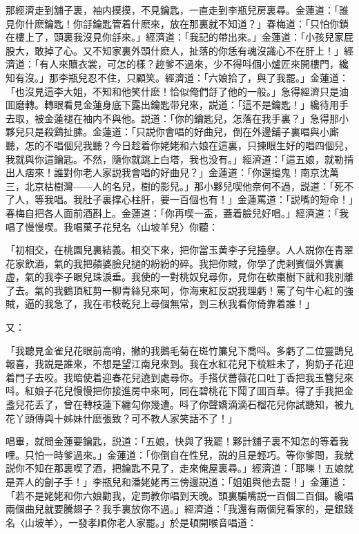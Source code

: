 那經濟走到舖子裏，袖内摸摸，不見鑰匙，一直走到李瓶兒房裏尋。金蓮道：「誰見你什麽鑰匙！你㧱鑰匙管着什麽來，放在那裏就不知道？」春梅道：「只怕你鎖在樓上了，頭裏我沒見你㧱來。」經濟道：「我記的帶出來。」金蓮道：「小孩兒家屁股大，敢掉了心。又不知家裏外頭什麽人，扯落的你恁有魂沒識心不在肝上！」經濟道：「有人來贖衣裳，可怎的樣？趂爹不過來，少不得呌個小爐匠來開樓門，纔知有沒。」那李瓶兒忍不住，只顧笑。經濟道：「六娘拾了，與了我罷。」金蓮道：「也沒見這李大姐，不知和他笑什麽！恰似俺們㧱了他的一般。」急得經濟只是油囬磨轉。轉眼看見金蓮身底下露出鑰匙带兒來，説道：「這不是鑰匙！」纔待用手去取，被金蓮褪在袖内不與他。説道：「你的鑰匙兒，怎落在我手裏？」急得那小夥兒只是殺鷄扯膆。金蓮道：「只説你會唱的好曲兒，倒在外邊舖子裏唱與小廝聽，怎的不唱個兒我聽？今日趁着你姥姥和六娘在這裏，只揀眼生好的唱四個兒，我就與你這鑰匙。不然，隨你就跳上白塔，我也没有。」經濟道：「這五娘，就勒掯出人痞來！誰對你老人家説我會唱的好曲兒？」金蓮道：「你還搗鬼！南京沈萬三，北京枯樹灣——人的名兒，樹的影兒。」那小夥兒喫他奈何不過，説道：「死不了人，等我唱。我肚子裏撑心柱肝，要一百個也有！」金蓮罵道：「説嘴的短命！」春梅自把各人面前酒斟上。金蓮道：「你再喫一盃，蓋着臉兒好唱。」經濟道：「我唱了慢慢喫。我唱菓子花兒名〈山坡羊兒〉你聽：

\begin{myquote}
「初相交，在桃園兒裏結義。相交下來，把你當玉黄李子兒擡擧。人人説你在青翠花家飲酒，氣的我把蘋婆臉兒撾的紛紛的碎。我把你賊，你學了虎剌賓個外實裏虚，氣的我李子眼兒珠淚垂。我使的一對桃奴兒尋你，見你在軟棗樹下就和我別離了去。氣的我鶴頂紅剪一柳青絲兒來呵，你海東紅反説我理虧！罵了句牛心紅的強賊，逼的我急了，我在弔枝乾兒上尋個無常，到三秋我看你倚靠着誰！」
\end{myquote}

又：

\begin{myquote}
「我聽見金雀兒花眼前高哨，撇的我鵝毛菊在斑竹簾兒下喬呌。多虧了二位靈鵲兒報喜，我説是誰來，不想是望江南兒來到。我在水紅花兒下梳粧未了，狗奶子花迎着門子去咬。我暗使着迎春花兒遶到處尋你。手搭伏薔薇花口吐丁香把我玉簪兒來呌。紅娘子花兒慢慢把你接進房中來呵，同在碧桃花下鬦了囬百草。得了手我把金盞兒花丢了，曾在轉枝蓮下纏勾你幾遭。呌了你聲嬌滴滴石榴花兒你試聽知，被九花丫頭傳與十姊妹什麽張致？可不教人家笑話不了！」
\end{myquote}

唱畢，就問金蓮要鑰匙，説道：「五娘，快與了我罷！夥計舖子裏不知怎的等着我哩。只怕一時爹過來。」金蓮道：「你倒自在性兒，説的且是輕巧。等你爹問，我就説你不知在那裏喫了酒，把鑰匙不見了，走來俺屋裏尋。」經濟道：「耶嚛！五娘就是弄人的劊子手！」李瓶兒和潘姥姥再三傍邊説道：「姐姐與他去罷！」金蓮道：「若不是姥姥和你六娘勸我，定罰教你唱到天晚。頭裏騙嘴説一百個二百個。纔唱兩個曲兒就要騰翅子？我手裏放你不過。」經濟道：「我還有兩個兒看家的，是銀錢名〈山坡羊〉，一發孝順你老人家罷。」於是頓開喉音唱道：

